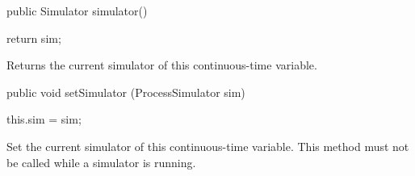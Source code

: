 \begin{code}

   public Simulator simulator() \begin{hide} {
      return sim;
   } \end{hide}
\end{code}
 \begin{tabb}   Returns the current simulator of this continuous-time variable.
 \end{tabb}
\begin{htmlonly}
\end{htmlonly}
\begin{code}

   public void setSimulator (ProcessSimulator sim) \begin{hide} {
      this.sim = sim;
   } \end{hide}
\end{code}
 \begin{tabb}   Set the current simulator of this continuous-time variable.
 This method must not be called while a simulator is running.
 \end{tabb}
\begin{htmlonly}
\end{htmlonly}
\begin{code}\begin{hide}
}\end{hide}
\end{code}
